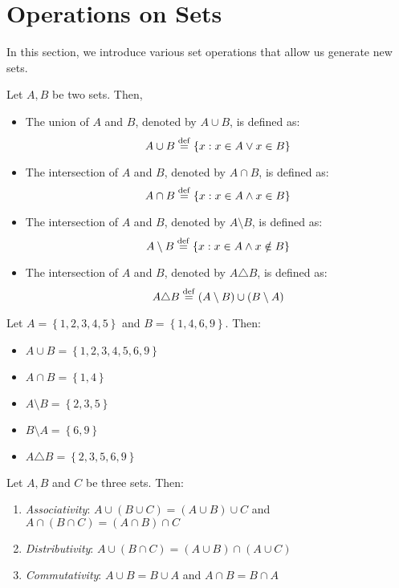 \documentclass[11pt]{scrartcl}
\begin{document}
    \section{Operations on Sets}
    In this section, we introduce various set operations that allow us generate new sets.
    \begin{definition}
        Let \(A, B\) be two sets. Then, 
        \begin{itemize}
            \item {} The union of \(A\) and \(B\), denoted by \(A \cup B\), is defined as: \[A \cup B \overset{\mathrm{def}}{=} \left\{x : x \in A \vee x \in B\right\}\]
            \item {} The intersection of \(A\) and \(B\), denoted by \(A \cap B\), is defined as: \[A \cap B \overset{\mathrm{def}}{=} \left\{x : x \in A \wedge x \in B\right\}\]
            \item {} The intersection of \(A\) and \(B\), denoted by \(A \setminus B\), is defined as: \[A \setminus B \overset{\mathrm{def}}{=} \left\{x : x \in A \wedge x \notin B\right\}\]
            \item {} The intersection of \(A\) and \(B\), denoted by \(A \triangle B\), is defined as: \[A \triangle B \overset{\mathrm{def}}{=} \left(A \setminus B\right) \cup \left(B \setminus A\right)\]
        \end{itemize}
    \end{definition}
    \begin{example}
        Let \(A = \left\{1, 2, 3, 4, 5\right\}\) and \(B = \left\{1, 4, 6, 9\right\}\). Then: 
        \begin{itemize}
            \item \(A \cup B = \left\{1, 2, 3, 4, 5, 6, 9\right\}\)
            \item \(A \cap B = \left\{1, 4\right\}\)
            \item \(A \setminus B = \left\{2, 3, 5\right\}\)
            \item \(B \setminus A = \left\{6, 9\right\}\)
            \item \(A \triangle B = \left\{2, 3, 5, 6, 9\right\}\)
        \end{itemize}
    \end{example}
    \begin{theorem}
        Let \(A, B\) and \(C\) be three sets. Then:
        \begin{enumerate}
            \item \emph{Associativity}: \(A \cup (B \cup C) = (A \cup B) \cup C\) and \(A \cap (B \cap C) = (A \cap B) \cap C\)
            \item \emph{Distributivity}: \(A \cup (B \cap C) = (A \cup B) \cap (A \cup C)\)
            \item \emph{Commutativity}: \(A \cup B = B \cup A\) and \(A \cap B = B \cap A\)
        \end{enumerate}
    \end{theorem}
\end{document}
